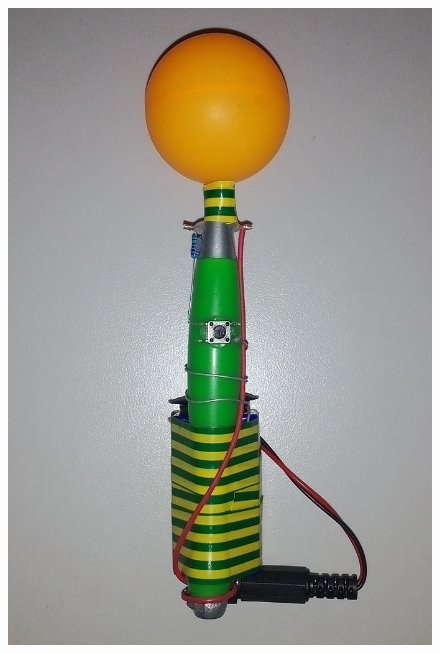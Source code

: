 \documentclass[a4paper, 12pt]{book}
\begin{document}
\begin{figure}[H]
\centering
\includegraphics[scale=0.6]{marker_off.png}

\end{figure}
\end{document}
